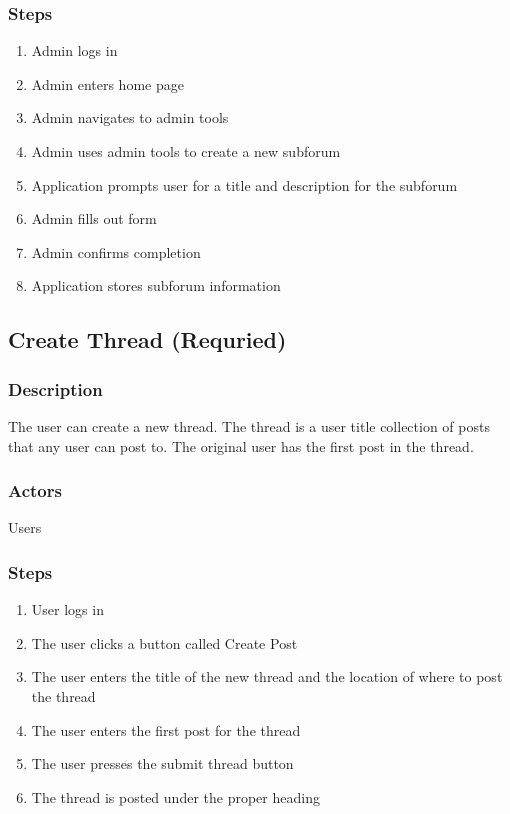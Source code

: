\documentclass[12pt]{scrartcl}
\begin{document}
\subsubsection{Steps}
\begin {enumerate}
\item Admin logs in
\item Admin enters home page
\item Admin navigates to admin tools
\item Admin uses admin tools to create a new subforum
\item Application prompts user for a title and description for the subforum
\item Admin fills out form
\item Admin confirms completion
\item Application stores subforum information
\end {enumerate}


\subsection{Create Thread (Requried)}
\subsubsection{Description}

The user can create a new thread. The thread is a user title collection of posts that any user can post to. The original user has the first post in the thread.

\subsubsection{Actors}

Users

\subsubsection{Steps}

\begin{enumerate}
\item User logs in
\item The user clicks a button called Create Post 
\item The user enters the title of the new thread and the location of where to post the thread
\item The user enters the first post for the thread
\item The user presses the submit thread button
\item The thread is posted under the proper heading
\end{enumerate}
\end{document}
